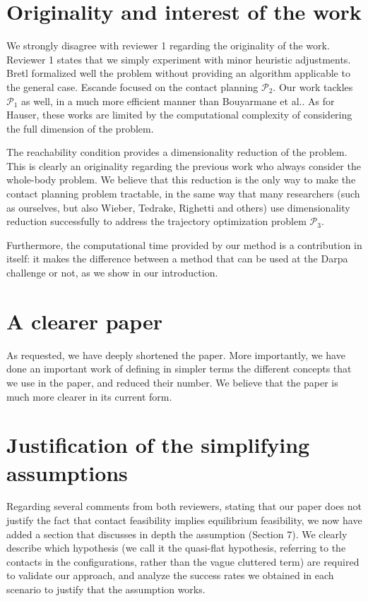 \documentclass[12pt]{article}
\begin{document}
\section{Originality and interest of the work}
We strongly disagree with reviewer 1 regarding the originality of the work. Reviewer 1 states that we simply experiment with minor heuristic adjustments.
Bretl formalized well the problem without providing an algorithm applicable to the general case. Escande focused on the contact planning $\mathcal{P}_2$. 
Our work tackles $\mathcal{P}_1$ as well, in a much more efficient manner than Bouyarmane et al.. 
As for Hauser, these works are limited by the computational complexity of considering the full dimension of the problem.


The reachability condition provides a dimensionality reduction of the problem. This is clearly an originality regarding the previous work who always consider the whole-body problem.
We believe that this reduction is the only way to make the contact planning problem tractable, in the same way that many researchers (such as ourselves, but also Wieber, Tedrake, Righetti and others) use dimensionality reduction successfully to address
the trajectory optimization problem $\mathcal{P}_3$.

Furthermore, the computational time provided by our method is a contribution in itself: it makes the difference
between a method that can be used at the Darpa challenge or not, as we show in our introduction.

\section{A clearer paper}
As requested, we have deeply shortened the paper. More importantly, we have done an important work of defining in simpler terms
the different concepts that we use in the paper, and reduced their number.
We believe that the paper is much more clearer in its current form.

\section{Justification of the simplifying assumptions}
Regarding several comments from both reviewers, stating that our paper does not justify the fact that contact feasibility implies equilibrium feasibility,
we now have added a section that discusses in depth the assumption (Section 7). We clearly describe which hypothesis (we call it the quasi-flat hypothesis, referring
to the contacts in the configurations, rather than the vague cluttered term) are required to validate our approach, and analyze
the success rates we obtained in each scenario to justify that the assumption works.
\end{document}
